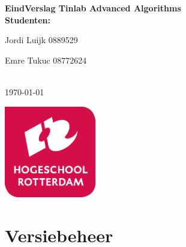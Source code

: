 \documentclass{article}
\begin{document}
\sffamily



\begin{titlepage}
  \centering
    \vfill
    {\bfseries\Huge
      EindVerslag Tinlab Advanced Algorithms \\
        \vskip2cm
      }
      {\bfseries\Large
        Studenten:\\
      }
      {
        \bfseries\normalsize\centerline{
        Jordi Luijk 0889529} \newline\centerline{
        Emre Tukuc 08772624} \newline\\
        \vskip1cm
        \today\\
    }    
    \vfill
    \includegraphics[width=4cm]{logohr.png} %
    \vfill
    \vfill
\end{titlepage}
\newpage
\tableofcontents

\newpage
\section{Versiebeheer}
\end{document}
